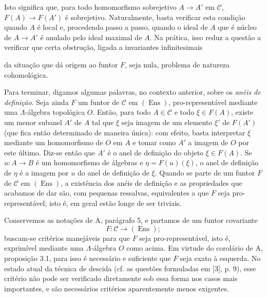 Isto significa que, para todo homomorfismo sobrejetivo
$A\longrightarrow A'$ em $\mathcal C$, $F(A)\longrightarrow F(A')$ é
sobrejetivo. Naturalmente, basta verificar esta condição quando $A$ é local
e, procedendo passo a passo, quando o ideal de $A$ que é núcleo de
$A\longrightarrow A'$ é anulado pelo ideal maximal de $A$. Na prática,
isso reduz a questão a verificar que certa obstrução, ligada a invariantes
infinitesimais

da situação que dá origem ao funtor $F$, seja nula, problema de natureza
cohomológica.

Para terminar, digamos algumas palavras, no contexto anterior, sobre os
\emph{anéis de definição}. Seja ainda $F$ um funtor de $\mathcal C$ em
$(\operatorname{Ens})$, pro-representável mediante uma $\Lambda$-álgebra
topológica $O$. Então, para todo $A\in\mathcal C$ e todo $\xi\in F(A)$,
existe um menor subanel $A'$ de $A$ tal que $\xi$ seja imagem de um elemento
$\xi'$ de $F(A')$ (que fica então determinado de maneira única): com efeito,
basta interpretar $\xi$ mediante um homomorfismo de $O$ em $A$ e tomar como
$A'$ a imagem de $O$ por este último. Diz-se então que $A'$ é o anel
de definição do objeto $\xi\in F(A)$. Se $u:A\longrightarrow B$ é um
homomorfismo de álgebras e $\eta=F(u)(\xi)$, o anel de definição de $\eta$
é a imagem por $u$ do anel de definição de $\xi$. Quando se parte de um
funtor $F$ de $\mathcal C$ em $(\operatorname{Ens})$, a existência dos
anéis de definição e as propriedades que acabamos de dar são, com pequenas
ressalvas, equivalentes a que $F$ seja pro-representável; isto é, em
geral estão longe de ser triviais.


Conservemos as notações de A, parágrafo 5, e partamos de um funtor covariante
\[
  F:\mathcal C\longrightarrow(\operatorname{Ens});
\]
buscam-se critérios manejáveis para que $F$ seja pro-representável, isto é,
exprimível mediante uma $\Lambda$-álgebra $O$ como acima. Em virtude do
corolário de A, proposição 3.1, para isso é necessário e suficiente que $F$ seja
exato à esquerda. No estado atual da técnica de descida (cf. as
questões formuladas em [3], p. 9), esse critério não pode ser verificado
diretamente sob essa forma nos casos mais importantes, e são necessários
critérios aparentemente menos exigentes.


